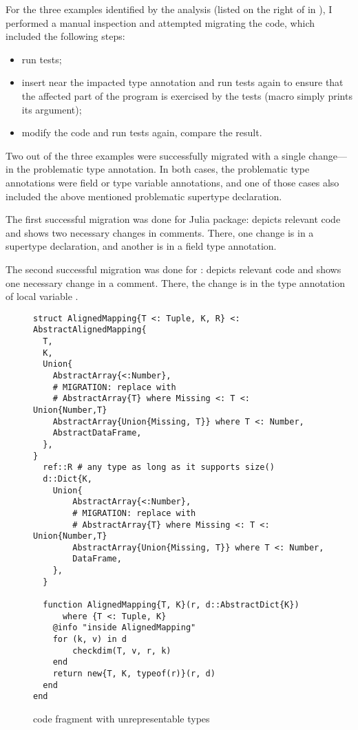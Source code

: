 For the three examples identified by the analysis (listed on the right of
 in ),
I performed a manual inspection and attempted migrating the code,
which included the following steps:
\begin{itemize}
  \item run tests;
  \item insert  near the impacted type annotation and run
    tests again to ensure that the affected part of the program is exercised by
    the tests (macro  simply prints its argument);
  \item modify the code and run tests again, compare the result.
\end{itemize}

Two out of the three examples were successfully migrated with a single
change---in the problematic type annotation.
In both cases, the problematic type annotations were
field or type variable annotations, and one of those cases also included
the above mentioned problematic supertype declaration.

The first successful migration was done for  Julia package:
 depicts relevant code
and shows two necessary changes in comments.
There, one change is in a supertype declaration, and another
is in a field type annotation.

The second successful migration was done for :
 depicts relevant code
and shows one necessary change in a comment.
There, the change is in the type annotation of local variable .

\begin{figure}
\begin{minipage}{12cm}
\begin{lstlisting}
struct AlignedMapping{T <: Tuple, K, R} <: 
AbstractAlignedMapping{
  T,
  K,
  Union{
    AbstractArray{<:Number},
    # MIGRATION: replace with
    # AbstractArray{T} where Missing <: T <: Union{Number,T}
    AbstractArray{Union{Missing, T}} where T <: Number,
    AbstractDataFrame,
  },
}
  ref::R # any type as long as it supports size()
  d::Dict{K,
    Union{
        AbstractArray{<:Number},
        # MIGRATION: replace with
        # AbstractArray{T} where Missing <: T <: Union{Number,T}
        AbstractArray{Union{Missing, T}} where T <: Number,
        DataFrame,
    },
  }
  
  function AlignedMapping{T, K}(r, d::AbstractDict{K}) 
      where {T <: Tuple, K}
    @info "inside AlignedMapping"
    for (k, v) in d
        checkdim(T, v, r, k)
    end
    return new{T, K, typeof(r)}(r, d)
  end
end
\end{lstlisting}
\end{minipage}
\caption{ code fragment with unrepresentable types
}\label{fig:evaluation-migrate-muon}
\end{figure}

